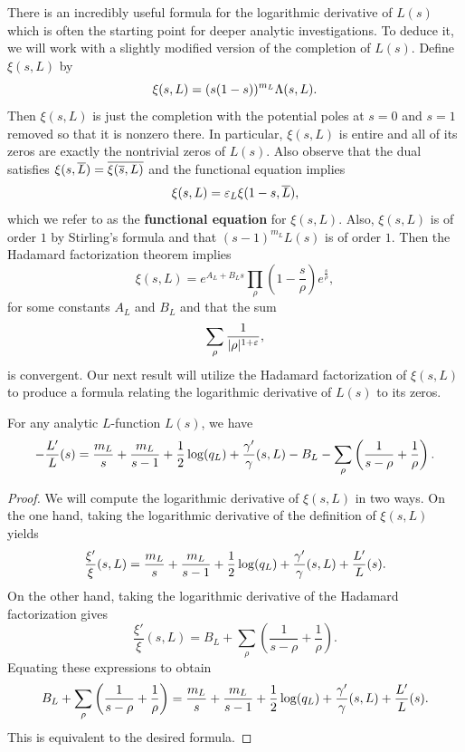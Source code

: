     There is an incredibly useful formula for the logarithmic derivative of \(L(s)\) which is often the starting point for deeper analytic investigations. To deduce it, we will work with a slightly modified version of the completion of \(L(s)\). Define \(\xi(s,L)\) by
    \[
      \xi(s,L) = (s(1-s))^{m_{L}}\Lambda(s,L).
    \]
    Then \(\xi(s,L)\) is just the completion with the potential poles at \(s = 0\) and \(s = 1\) removed so that it is nonzero there. In particular, \(\xi(s,L)\) is entire and all of its zeros are exactly the nontrivial zeros of \(L(s)\). Also observe that the dual satisfies \(\xi(s,\overline{L}) = \overline{\xi(\overline{s},L)}\) and the functional equation implies
    \[
      \xi(s,L) = \varepsilon_{L}\xi(1-s,\overline{L}),
    \]
    which we refer to as the \textbf{functional equation} for \(\xi(s,L)\). Also, \(\xi(s,L)\) is of order \(1\) by Stirling's formula and that \((s-1)^{m_{L}}L(s)\) is of order \(1\). Then the Hadamard factorization theorem implies
    \[
      \xi(s,L) = e^{A_{L}+B_{L}s}\prod_{\rho}\left(1-\frac{s}{\rho}\right)e^{\frac{s}{\rho}},
    \]
    for some constants \(A_{L}\) and \(B_{L}\) and that the sum
    \begin{equation}\label{Hadamard_zero_sum_for_xi}
      \sum_{\rho}\frac{1}{|\rho|^{1+\varepsilon}},
    \end{equation}
    is convergent. Our next result will utilize the Hadamard factorization of \(\xi(s,L)\) to produce a formula relating the logarithmic derivative of \(L(s)\) to its zeros.

    \begin{proposition}\label{prop:explicit_formula_log_derivative}
      For any analytic \(L\)-function \(L(s)\), we have
      \[
        -\frac{L'}{L}(s) = \frac{m_{L}}{s}+\frac{m_{L}}{s-1}+\frac{1}{2}\log(q_{L})+\frac{\gamma'}{\gamma}(s,L)-B_{L}-\sum_{\rho}\left(\frac{1}{s-\rho}+\frac{1}{\rho}\right).
      \]
    \end{proposition}
    \begin{proof}
      We will compute the logarithmic derivative of \(\xi(s,L)\) in two ways. On the one hand, taking the logarithmic derivative of the definition of \(\xi(s,L)\) yields
      \[
        \frac{\xi'}{\xi}(s,L) = \frac{m_{L}}{s}+\frac{m_{L}}{s-1}+\frac{1}{2}\log(q_{L})+\frac{\gamma'}{\gamma}(s,L)+\frac{L'}{L}(s).
      \]
      On the other hand, taking the logarithmic derivative of the Hadamard factorization gives
      \[
        \frac{\xi'}{\xi}(s,L) = B_{L}+\sum_{\rho}\left(\frac{1}{s-\rho}+\frac{1}{\rho}\right).
      \]
      Equating these expressions to obtain
      \[
        B_{L}+\sum_{\rho}\left(\frac{1}{s-\rho}+\frac{1}{\rho}\right) = \frac{m_{L}}{s}+\frac{m_{L}}{s-1}+\frac{1}{2}\log(q_{L})+\frac{\gamma'}{\gamma}(s,L)+\frac{L'}{L}(s).
      \]
      This is equivalent to the desired formula.
    \end{proof}


